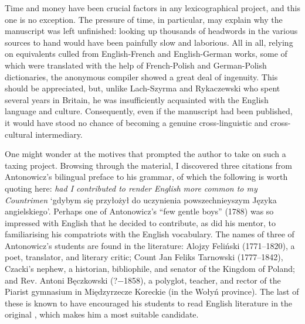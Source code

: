 \documentclass[output=paper,colorlinks,citecolor=brown,arabicfont,chinesefont]{langscibook}
\begin{document}
Time and money have been crucial factors in any lexicographical project, and this one is no exception. The pressure of time, in particular, may explain why the manuscript was left unfinished: looking up thousands of headwords in the various sources to hand would have been painfully slow and laborious. All in all, relying on equivalents culled from English-French and English-German works, some of which were translated with the help of French-Polish and German-Polish dictionaries, the anonymous compiler showed a great deal of ingenuity. This should be appreciated, but, unlike Lach-Szyrma and Rykaczewski who spent several years in Britain, he was insufficiently acquainted with the English language and culture. Consequently, even if the manuscript had been published, it would have stood no chance of becoming a genuine cross-linguistic and cross-cultural intermediary. 

One might wonder at the motives that prompted the author to take on such a taxing project. Browsing through the material, I discovered three citations from Antonowicz’s bilingual preface to his grammar, of which the following is worth quoting here: \emph{had I contributed to render English more common to my Countrimen} ‘gdybym się przyłożył do uczynienia powszechnieyszym Języka angielskiego’. Perhaps one of Antonowicz’s “few gentle boys” (1788) was so impressed with English that he decided to contribute, as did his mentor, to familiarising his compatriots with the English vocabulary. The names of three of Antonowicz’s students are found in the literature: Alojzy Feliński (1771--1820), a poet, translator, and literary critic; Count Jan Feliks Tarnowski (1777--1842), Czacki’s nephew, a historian, bibliophile, and senator of the Kingdom of Poland; and Rev. Antoni Bęczkowski (?−1858), a polyglot, teacher, and rector of the Piarist gymnasium in Międzyrzecze Koreckie (in the Wołyń province). The last of these is known to have encouraged his students to read English literature in the original \citep[236]{Kowalski_franciszek1859}, which makes him a most suitable candidate.

{\sloppy\printbibliography[heading=subbibliography,notkeyword=this]}
\end{document}
